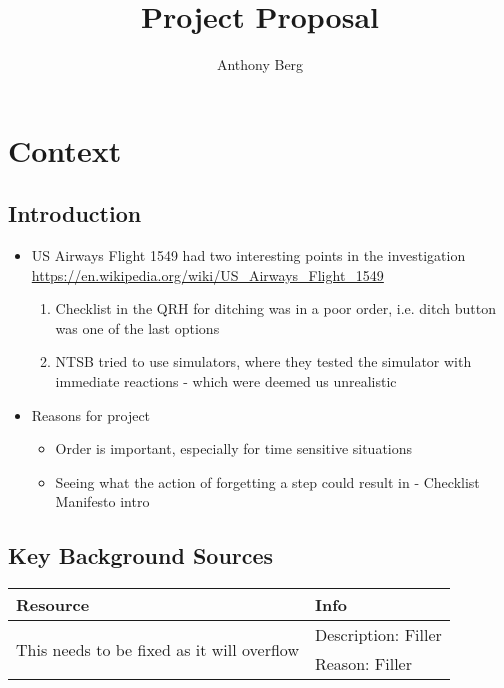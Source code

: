 \documentclass[a4paper]{article}
\author{Anthony Berg}
\title{Project Proposal}
\begin{document}
\begin{titlepage}
    \clearpage\maketitle
    \thispagestyle{empty}
\end{titlepage}

\section{Context}
\subsection{Introduction}
\begin{itemize}
    \item US Airways Flight 1549 had two interesting points in the investigation
        \url{https://en.wikipedia.org/wiki/US_Airways_Flight_1549}
        \begin{enumerate}
            \item Checklist in the QRH for ditching was in a poor order,
                i.e. ditch button was one of the last options
            \item NTSB tried to use simulators, where they tested
                the simulator with immediate reactions - which were
                deemed us unrealistic
        \end{enumerate}
    \item Reasons for project
        \begin{itemize}
            \item Order is important, especially for time sensitive
                situations
            \item Seeing what the action of forgetting a step could
                result in - Checklist Manifesto intro
        \end{itemize}
\end{itemize}

\subsection{Key Background Sources}
\begin{tabularx}{\linewidth}{p{5em} X}
    \toprule
    Resource & Info \\
    \midrule
    \multirow{2}{*}{\parbox{5em}{This needs to be fixed as it will overflow}}
    & Description: Filler \\
    & Reason: Filler \\
    \bottomrule
\end{tabularx}
\end{document}
